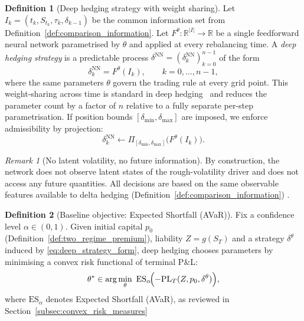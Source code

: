 \documentclass[12pt,a4paper]{article}
\theoremstyle{definition}
\newtheorem{definition}{Definition}[section]
\theoremstyle{plain}
\theoremstyle{remark}
\newtheorem{remark}{Remark}[section]
\theoremstyle{plain}
\begin{document}
\label{subsubsec:deep_strategy_class}

\begin{definition}[Deep hedging strategy with weight sharing]\label{def:deep_strategy_class}
Let $I_k=(t_k,S_{t_k},\tau_k,\delta_{k-1})$ be the common information set from Definition~\ref{def:comparison_information}.
Let $F^\theta : \mathbb{R}^{|I|} \to \mathbb{R}$ be a single feedforward neural network parametrised by $\theta$ and applied at every rebalancing time. A \emph{deep hedging strategy} is a predictable process $\delta^{\mathrm{NN}}=(\delta_k^{\mathrm{NN}})_{k=0}^{n-1}$ of the form
\begin{equation}
\label{eq:deep_strategy_form}
\delta_k^{\mathrm{NN}} = F^\theta(I_k),
\qquad k=0,\dots,n-1,
\end{equation}
where the same parameters $\theta$ govern the trading rule at every grid point. This weight-sharing across time is standard in deep hedging~\cite{Buehler2019DeepHedging} and reduces the parameter count by a factor of $n$ relative to a fully separate per-step parametrisation.
If position bounds $[\delta_{\min},\delta_{\max}]$ are imposed, we enforce admissibility by projection:
\[
\delta_k^{\mathrm{NN}} \leftarrow \Pi_{[\delta_{\min},\delta_{\max}]}\!\bigl(F^\theta(I_k)\bigr).
\]
\end{definition}

\begin{remark}[No latent volatility, no future information]
\label{rem:nn_no_latent_no_future}
By construction, the network does not observe latent states of the rough-volatility driver and does not access any future quantities.
All decisions are based on the same observable features available to delta hedging (Definition~\ref{def:comparison_information}) \cite{Buehler2019DeepHedging,Horvath2021DeepRough}.
\end{remark}

\label{subsubsec:deep_objective}

\begin{definition}[Baseline objective: Expected Shortfall (AVaR)]
\label{def:deep_objective_es}
Fix a confidence level $\alpha\in(0,1)$.
Given initial capital $p_0$ (Definition~\ref{def:two_regime_premium}), liability $Z=g(S_T)$ and a strategy $\delta^\theta$ induced by \eqref{eq:deep_strategy_form},
deep hedging chooses parameters by minimising a convex risk functional of terminal P\&L:
\begin{equation}
\label{eq:deep_es_objective}
\theta^\ast \in \arg\min_{\theta}\ \mathrm{ES}_{\alpha}\!\Bigl(-\mathrm{PL}_T(Z,p_0,\delta^\theta)\Bigr),
\end{equation}
where $\mathrm{ES}_{\alpha}$ denotes Expected Shortfall (AVaR), as reviewed in Section~\ref{subsec:convex_risk_measures} \cite{FoellmerSchied2016,Buehler2019DeepHedging}
\end{definition}
\end{document}
